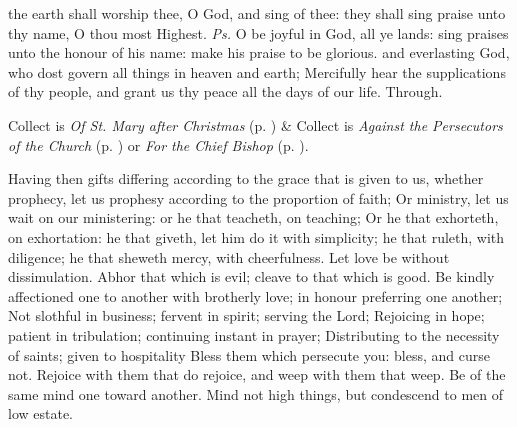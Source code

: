 
\introit
{} the earth shall worship thee, O God, and sing of thee: they shall sing praise unto thy name, O thou most Highest. \textit{Ps.} O be joyful in God, all ye lands: sing praises unto the honour of his name: make his praise to be glorious.
\collect
{} and everlasting God, who dost govern all things in heaven and earth; Mercifully hear the supplications of thy people, and grant us thy peace all the days of our life. Through.
\begin{rubric}
     Collect is \emph{Of St. Mary after Christmas} (p. \pageref{SPMaryPostChristmas}) \&  Collect is \emph{Against the Persecutors of the Church} (p. \pageref{SPAgainst}) or \emph{For the Chief Bishop} (p. \pageref{SPChiefBishop}).
\end{rubric}
 Having then gifts differing according to the grace that is given to us, whether prophecy, let us prophesy according to the proportion of faith; Or ministry, let us wait on our ministering: or he that teacheth, on teaching; Or he that exhorteth, on exhortation: he that giveth, let him do it with simplicity; he that ruleth, with diligence; he that sheweth mercy, with cheerfulness. Let love be without dissimulation. Abhor that which is evil; cleave to that which is good. Be kindly affectioned one to another with brotherly love; in honour preferring one another; Not slothful in business; fervent in spirit; serving the Lord; Rejoicing in hope; patient in tribulation; continuing instant in prayer; Distributing to the necessity of saints; given to hospitality Bless them which persecute you: bless, and curse not. Rejoice with them that do rejoice, and weep with them that weep. Be of the same mind one toward another. Mind not high things, but condescend to men of low estate.

